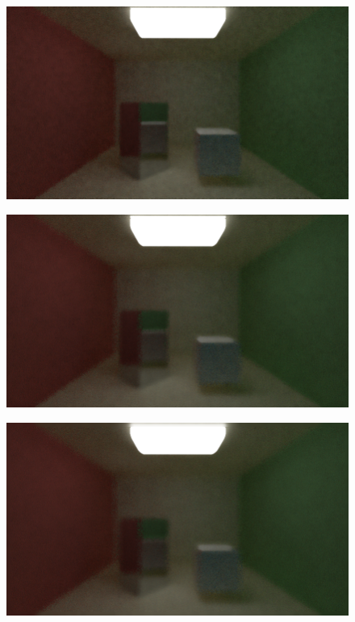 \documentclass[titlepage,12pt]{report}
\begin{document}
\begin{appendices}
\begin{figure}[H]
	\centering
  	\includegraphics[scale=0.5]{media/median/cornell_normal_50_median_filter_11.png}
  	\label{ap14}
\end{figure}

\begin{figure}[H]
	\centering
  	\includegraphics[scale=0.5]{media/median/cornell_normal_50_median_filter_17.png}
  	\label{ap15}
\end{figure}

\begin{figure}[H]
	\centering
  	\includegraphics[scale=0.5]{media/median/cornell_normal_50_median_filter_21.png}
  	\label{ap16}
\end{figure}




\end{appendices}
\end{document}
